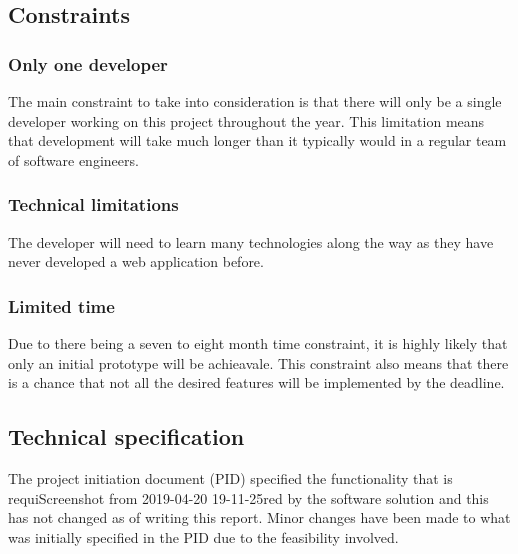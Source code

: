 \subsection{Constraints}

\subsubsection*{Only one developer}
The main constraint to take into consideration is that there will only be a single developer working on this project throughout the year.
This limitation means that development will take much longer than it typically would in a regular team of software engineers.

\subsubsection*{Technical limitations}
The developer will need to learn many technologies along the way as they have never developed a web application before.

\subsubsection*{Limited time}
Due to there being a seven to eight month time constraint, it is highly likely that only an initial prototype will be achieavale.
This constraint also means that there is a chance that not all the desired features will be implemented by the deadline. 


\subsection{Technical specification}
The project initiation document (PID) specified the functionality that is requiScreenshot from 2019-04-20 19-11-25red by the software solution and this has not changed as of writing this report.
Minor changes have been made to what was initially specified in the PID due to the feasibility involved.

